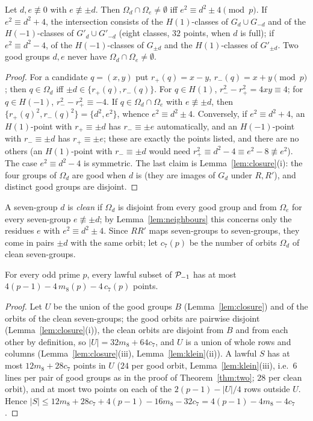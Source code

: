 \begin{lemma}[neighbours]\label{lem:neighbours}
Let $d,e\not\equiv0$ with $e\not\equiv\pm d$.  Then $\Omega_d\cap\Omega_e\ne\emptyset$ iff $e^2\equiv d^2\pm4\pmod p$.  If
$e^2\equiv d^2+4$, the intersection consists of the $H(1)$-classes of $G_d\cup G_{-d}$ and of the $H(-1)$-classes of $G'_d\cup G'_{-d}$
(eight classes, $32$ points, when $d$ is full); if $e^2\equiv d^2-4$, of the $H(-1)$-classes of $G_{\pm d}$ and the $H(1)$-classes of $G'_{\pm d}$.
Two good groups $d,e$ never have $\Omega_d\cap\Omega_e\neq\emptyset$.
\end{lemma}
\begin{proof}
For a candidate $q=(x,y)$ put $r_+(q)=x-y$, $r_-(q)=x+y\pmod p$; then $q\in\Omega_d$ iff $\pm d\in\{r_+(q),r_-(q)\}$.  For $q\in H(1)$,
$r_-^2-r_+^2=4xy\equiv4$; for $q\in H(-1)$, $r_-^2-r_+^2\equiv-4$.  If $q\in\Omega_d\cap\Omega_e$ with $e\not\equiv\pm d$, then
$\{r_+(q)^2,r_-(q)^2\}=\{d^2,e^2\}$, whence $e^2\equiv d^2\pm4$.  Conversely, if $e^2\equiv d^2+4$, an $H(1)$-point with $r_+\equiv\pm d$
has $r_-\equiv\pm e$ automatically, and an $H(-1)$-point with $r_-\equiv\pm d$ has $r_+\equiv\pm e$; these are exactly the points listed,
and there are no others (an $H(1)$-point with $r_-\equiv\pm d$ would need $r_+^2\equiv d^2-4\equiv e^2-8\not\equiv e^2$).  The case
$e^2\equiv d^2-4$ is symmetric.  The last claim is Lemma~\ref{lem:closure}(i): the four groups of $\Omega_d$ are good when $d$ is
(they are images of $G_d$ under $R,R'$), and distinct good groups are disjoint.
\end{proof}

A seven-group $d$ is \emph{clean} if $\Omega_d$ is disjoint from every good group and from $\Omega_e$ for every seven-group
$e\not\equiv\pm d$; by Lemma~\ref{lem:neighbours} this concerns only the residues $e$ with $e^2\equiv d^2\pm4$.  Since $RR'$ maps
seven-groups to seven-groups, they come in pairs $\pm d$ with the same orbit; let $c_7(p)$ be the number of orbits $\Omega_d$ of clean
seven-groups.

\begin{theorem}\label{thm:seven}
For every odd prime $p$, every lawful subset of $\mathcal{P}_{-1}$ has at most $4(p-1)-4\,m_8(p)-4\,c_7(p)$ points.
\end{theorem}
\begin{proof}
Let $U$ be the union of the good groups $B$ (Lemma~\ref{lem:closure}) and of the orbits of the clean seven-groups; the good orbits are
pairwise disjoint (Lemma~\ref{lem:closure}(i)), the clean orbits are disjoint from $B$ and from each other by definition, so
$|U|=32m_8+64c_7$, and $U$ is a union of whole rows and columns (Lemma~\ref{lem:closure}(iii), Lemma~\ref{lem:klein}(ii)).  A lawful $S$
has at most $12m_8+28c_7$ points in $U$ ($24$ per good orbit, Lemma~\ref{lem:klein}(iii), i.e.\ $6$ lines per pair of good groups as in the
proof of Theorem~\ref{thm:two}; $28$ per clean orbit), and at most two points on each of the $2(p-1)-|U|/4$ rows outside $U$.  Hence
$|S|\le12m_8+28c_7+4(p-1)-16m_8-32c_7=4(p-1)-4m_8-4c_7$.
\end{proof}

